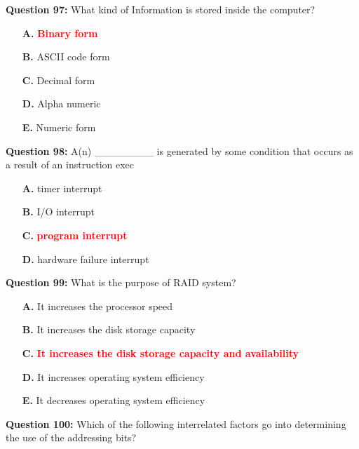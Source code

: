 \documentclass[12pt,a4paper]{article}
\begin{document}
\vspace{0.5cm}

\textbf{Question 97:} What kind of Information is stored inside the computer?

\begin{itemize}
    \item[\textbf{A.}] \textcolor{red}{\textbf{Binary form}}
    \item[\textbf{B.}] ASCII code form
    \item[\textbf{C.}] Decimal form
    \item[\textbf{D.}] Alpha numeric
    \item[\textbf{E.}] Numeric form
\end{itemize}

\vspace{0.5cm}

\textbf{Question 98:} A(n) ________ is generated by some condition that occurs as a result of an instruction exec

\begin{itemize}
    \item[\textbf{A.}] timer interrupt
    \item[\textbf{B.}] I/O interrupt
    \item[\textbf{C.}] \textcolor{red}{\textbf{program interrupt}}
    \item[\textbf{D.}] hardware failure interrupt
\end{itemize}

\vspace{0.5cm}

\textbf{Question 99:} What is the purpose of RAID system?

\begin{itemize}
    \item[\textbf{A.}] It increases the processor speed
    \item[\textbf{B.}] It increases the disk storage capacity
    \item[\textbf{C.}] \textcolor{red}{\textbf{It increases the disk storage capacity and availability}}
    \item[\textbf{D.}] It increases operating system efficiency
    \item[\textbf{E.}] It decreases operating system efficiency
\end{itemize}

\vspace{0.5cm}

\textbf{Question 100:} Which of the following interrelated factors go into determining the use of the addressing bits?
\end{document}
